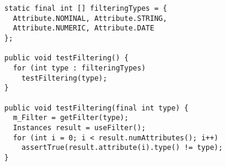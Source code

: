 \begin{lstlisting}
  static final int [] filteringTypes = {
    Attribute.NOMINAL, Attribute.STRING,
    Attribute.NUMERIC, Attribute.DATE
  };

  public void testFiltering() {
    for (int type : filteringTypes)
      testFiltering(type);
  }

  public void testFiltering(final int type) {
    m_Filter = getFilter(type);
    Instances result = useFilter();
    for (int i = 0; i < result.numAttributes(); i++)
      assertTrue(result.attribute(i).type() != type);
  }
\end{lstlisting}
